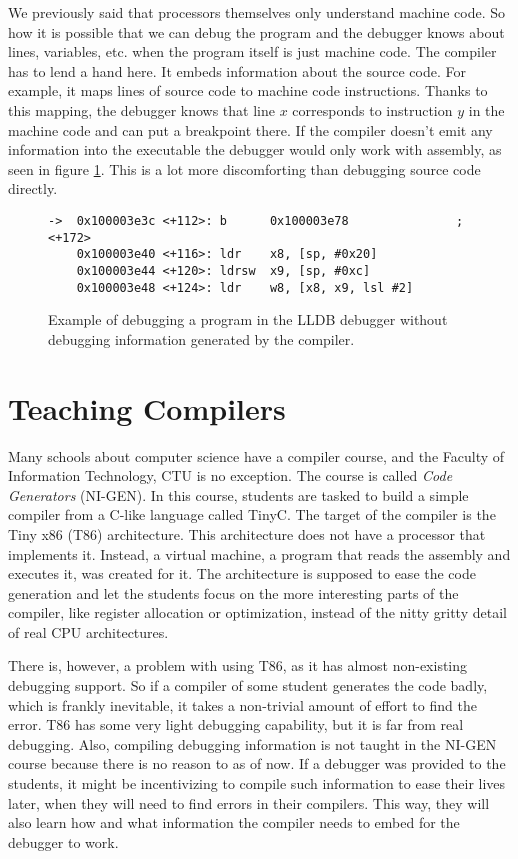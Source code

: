 We previously said that processors themselves only understand machine code. So
how it is possible that we can debug the program and the debugger knows about
lines, variables, etc. when the program itself is just machine code. The
compiler has to lend a hand here. It embeds information about the source code.
For example, it maps lines of source code to machine code instructions. Thanks
to this mapping, the debugger knows that line $x$ corresponds to instruction
$y$ in the machine code and can put a breakpoint there. If the compiler doesn't
emit any information into the executable the debugger would only work with
assembly, as seen in figure \ref{fig:lldb-debug2}. This is a lot more
discomforting than debugging source code directly.

\begin{figure}
\begin{lstlisting}
->  0x100003e3c <+112>: b      0x100003e78               ; <+172>
    0x100003e40 <+116>: ldr    x8, [sp, #0x20]
    0x100003e44 <+120>: ldrsw  x9, [sp, #0xc]
    0x100003e48 <+124>: ldr    w8, [x8, x9, lsl #2]
\end{lstlisting}
\caption{Example of debugging a program in the LLDB debugger without debugging
    information generated by the compiler.}
\label{fig:lldb-debug2}
\end{figure}

\section{Teaching Compilers}
Many schools about computer science have a compiler course, and the Faculty of
Information Technology, CTU is no exception. The course is called \textit{Code
Generators} (NI-GEN). In this course, students are tasked to build a simple
compiler from a C-like language called TinyC. The target of the compiler is the
Tiny x86 (T86) architecture. This architecture does not have a processor that
implements it. Instead, a virtual machine, a program that reads the assembly
and executes it, was created for it. The architecture is supposed to ease the
code generation and let the students focus on the more interesting parts of the
compiler, like register allocation or optimization, instead of the nitty gritty
detail of real CPU architectures.

There is, however, a problem with using T86, as it has almost non-existing
debugging support. So if a compiler of some student generates the code badly,
which is frankly inevitable, it takes a non-trivial amount of effort to find
the error. T86 has some very light debugging capability, but it is far from
real debugging. Also, compiling debugging information is not taught in the
NI-GEN course because there is no reason to as of now. If a debugger was
provided to the students, it might be incentivizing to compile such information
to ease their lives later, when they will need to find errors in their
compilers. This way, they will also learn how and what information the compiler
needs to embed for the debugger to work.

